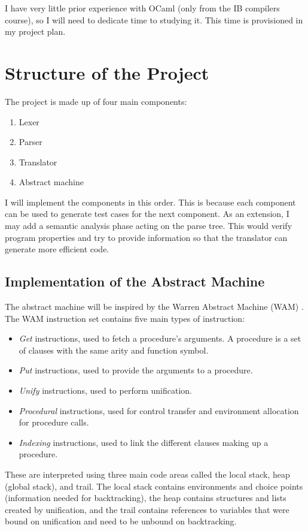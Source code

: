 \documentclass[12pt, a4paper]{article}
\begin{document}
I have very little prior experience with OCaml (only from the IB compilers course), so I will need to dedicate time to studying it. This time is provisioned in my project plan.

\section*{Structure of the Project}

The project is made up of four main components:
\vspace{-0.5em}
\begin{multicols}{2}
\begin{enumerate}
\item Lexer
\item Parser
\item Translator
\item Abstract machine
\end{enumerate}
\end{multicols}
\vspace{-1em}

I will implement the components in this order. This is because each component can be used to generate test cases for the next component. As an extension, I may add a semantic analysis phase acting on the parse tree. This would verify program properties and try to provide information so that the translator can generate more efficient code.

\subsection*{Implementation of the Abstract Machine}

The abstract machine will be inspired by the Warren Abstract Machine (WAM) \cite{WAM}. The WAM instruction set contains five main types of instruction:
\begin{itemize}
\item \emph{Get} instructions, used to fetch a procedure's arguments. A procedure is a set of clauses with the same arity and function symbol.
\item \emph{Put} instructions, used to provide the arguments to a procedure.
\item \emph{Unify} instructions, used to perform unification.
\item \emph{Procedural} instructions, used for control transfer and environment allocation for procedure calls.
\item \emph{Indexing} instructions, used to link the different clauses making up a procedure.
\end{itemize}
 These are interpreted using three main code areas called the local stack, heap (global stack), and trail. The local stack contains environments and choice points (information needed for backtracking), the heap contains structures and lists created by unification, and the trail contains references to variables that were bound on unification and need to be unbound on backtracking.
\end{document}
